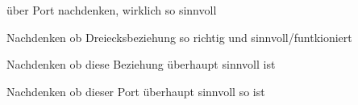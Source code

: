 
\begin{DoxyRefList}
\item[\label{todo__todo000001}%
\hypertarget{todo__todo000001}{}%
Global \hyperlink{_y_a_s_a___r_t_e_a_p_i_8h_aaf0aa7911143ab166f4c6c469824fafa}{R\-T\-E\-\_\-\-Schussanlage\-\_\-\-Get\-Order\-\_\-\-Server\-\_\-\-In} ()]über Port nachdenken, wirklich so sinnvoll  
\item[\label{todo__todo000002}%
\hypertarget{todo__todo000002}{}%
Global \hyperlink{_y_a_s_a___r_t_e_a_p_i_8h_a35c4166848acd89a0d0d4dc94dc7e841}{R\-T\-E\-\_\-\-Schussanlage\-\_\-\-Send\-Message\-\_\-\-Sender\-\_\-\-Out} ()]Nachdenken ob Dreiecksbeziehung so richtig und sinnvoll/funtkioniert  
\item[\label{todo__todo000004}%
\hypertarget{todo__todo000004}{}%
Global \hyperlink{_y_a_s_a___r_t_e_a_p_i_8h_a36802657cfbad42518b0993ec91a4de0}{R\-T\-E\-\_\-\-Trigger\-\_\-\-Get\-Message\-\_\-\-Receiver\-\_\-\-In} ()]Nachdenken ob diese Beziehung überhaupt sinnvoll ist  
\item[\label{todo__todo000003}%
\hypertarget{todo__todo000003}{}%
Global \hyperlink{_y_a_s_a___r_t_e_a_p_i_8h_a91c489b5753171b7cfa32718e4d05b1d}{R\-T\-E\-\_\-\-Trigger\-\_\-\-Set\-Order\-\_\-\-Client\-\_\-\-Out} ()]Nachdenken ob dieser Port überhaupt sinnvoll so ist 
\end{DoxyRefList}